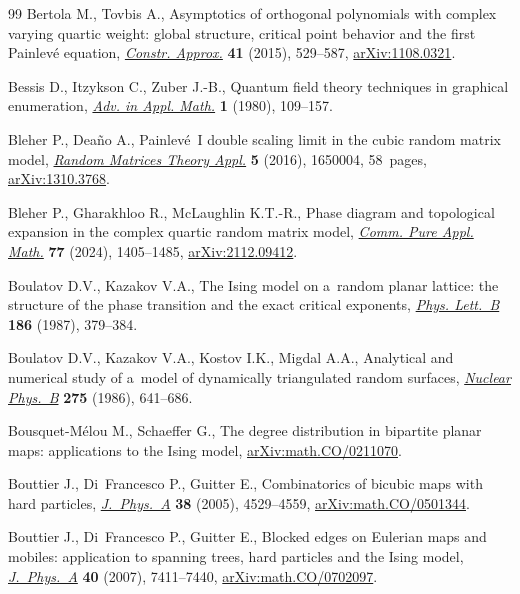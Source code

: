 \documentclass[10pt,a4paper]{amsart}
\numberwithin{equation}{section}
\begin{document}
\begin{thebibliography}{99}
Bertola M., Tovbis A., Asymptotics of orthogonal polynomials with complex
 varying quartic weight: global structure, critical point behavior and the
 first {P}ainlev\'e equation,
 \href{https://doi.org/10.1007/s00365-015-9288-0}{\textit{Constr. Approx.}}
 \textbf{41} (2015), 529--587,
 \href{http://arxiv.org/abs/1108.0321}{arXiv:1108.0321}.

Bessis D., Itzykson C., Zuber J.-B., Quantum field theory techniques in
 graphical enumeration,
 \href{https://doi.org/10.1016/0196-8858(80)90008-1}{\textit{Adv. in Appl.
 Math.}} \textbf{1} (1980), 109--157.

Bleher P., Dea\~no A., Painlev\'e~{I} double scaling limit in the cubic random
 matrix model, \href{https://doi.org/10.1142/S2010326316500040}{\textit{Random
 Matrices Theory Appl.}} \textbf{5} (2016), 1650004, 58~pages,
 \href{http://arxiv.org/abs/1310.3768}{arXiv:1310.3768}.

Bleher P., Gharakhloo R., McLaughlin K.T.-R., Phase diagram and topological
 expansion in the complex quartic random matrix model,
 \href{https://doi.org/10.1002/cpa.22164}{\textit{Comm. Pure Appl. Math.}}
 \textbf{77} (2024), 1405--1485,
 \href{http://arxiv.org/abs/2112.09412}{arXiv:2112.09412}.

Boulatov D.V., Kazakov V.A., The {I}sing model on a~random planar lattice: the
 structure of the phase transition and the exact critical exponents,
 \href{https://doi.org/10.1016/0370-2693(87)90312-1}{\textit{Phys. Lett.~B}}
 \textbf{186} (1987), 379--384.

Boulatov D.V., Kazakov V.A., Kostov I.K., Migdal A.A., Analytical and numerical
 study of a~model of dynamically triangulated random surfaces,
 \href{https://doi.org/10.1016/0550-3213(86)90578-X}{\textit{Nuclear Phys.~B}}
 \textbf{275} (1986), 641--686.

Bousquet-M\'elou M., Schaeffer G., The degree distribution in bipartite planar
 maps: applications to the {I}sing model,
 \href{http://arxiv.org/abs/math.CO/0211070}{arXiv:math.CO/0211070}.

Bouttier J., Di~Francesco P., Guitter E., Combinatorics of bicubic maps with
 hard particles,
 \href{https://doi.org/10.1088/0305-4470/38/21/002}{\textit{J.~Phys.~A}}
 \textbf{38} (2005), 4529--4559,
 \href{http://arxiv.org/abs/math.CO/0501344}{arXiv:math.CO/0501344}.

Bouttier J., Di~Francesco P., Guitter E., Blocked edges on {E}ulerian maps and
 mobiles: application to spanning trees, hard particles and the {I}sing model,
 \href{https://doi.org/10.1088/1751-8113/40/27/002}{\textit{J.~Phys.~A}}
 \textbf{40} (2007), 7411--7440,
 \href{http://arxiv.org/abs/math.CO/0702097}{arXiv:math.CO/0702097}.


\end{thebibliography}
\end{document}
